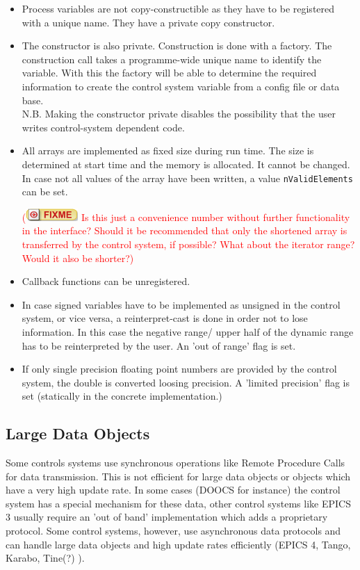 \documentclass[11pt,a4paper]{scrartcl}
\newcounter{nFixmes}
\newcommand{\fixme}[1]{\addtocounter{nFixmes}{1}\textcolor{red}{(\includegraphics[height=2ex]{fixme} #1)}\xspace}
\begin{document}
\begin{itemize}
\item Process variables are not copy-constructible as they have to be
  registered with a unique name. They have a private copy constructor. 
\item The constructor is also private. Construction is done with a
  factory. The construction call takes a programme-wide unique name to
  identify the variable. With this the factory will be able to determine the
  required information to create the control system variable from a config
  file or data base.\\
N.B. Making the constructor private disables the possibility that the user
writes control-system dependent code. 
\item All arrays are implemented as fixed size during run time. The size is 
      determined at start time and the memory is allocated. It cannot be changed.
      In case not all values of the array have been written, a value \texttt{nValidElements}
      can be set. \fixme{Is this just a convenience number without further functionality in
      the interface? Should it be recommended that only the shortened array is 
      transferred by the control system, if possible?
      What about the iterator range? Would it also be shorter?}
\item Callback functions can be unregistered.
\item In case signed variables have to be implemented as unsigned in the
  control system, or vice versa, a reinterpret-cast is done in order not to
  lose information. In this case the negative range/ upper half of the dynamic
  range has to be reinterpreted by the user. An 'out of range' flag is set. 
\item If only single precision floating point numbers are provided by the
  control system, the double is converted loosing precision. A 'limited
  precision' flag is set (statically in the concrete implementation.)
\end{itemize}

\subsection{Large Data Objects}

Some controls systems use synchronous operations like Remote Procedure Calls
for data transmission. This is not efficient for large data objects or objects
which have a very high update rate. In some cases (DOOCS for instance) the
control system has a special mechanism for these data, other control systems
like EPICS 3 usually require an 'out of band' implementation which adds a
proprietary protocol. Some control systems, however, use asynchronous data
protocols and can handle large data objects and high update rates efficiently
(EPICS 4, Tango, Karabo, Tine(?) ).
\end{document}
